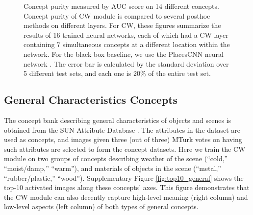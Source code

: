 \documentclass{article}
\begin{document}
\begin{figure}[htbp]
{\begin{minipage}[t]{0.24\linewidth}
\end{minipage}%
}
\centering
\caption{Concept purity measured by AUC score on 14 different concepts. Concept purity of CW module is compared to several posthoc methods on different layers. For CW, these figures summarize the results of 16 trained neural networks, each of which had a CW layer containing 7 simultaneous concepts at a different location within the network. For the black box baseline, we use the PlacesCNN neural network \citep{zhou2017places}. The error bar is calculated by the standard deviation over 5 different test sets, and each one is $20\%$ of the entire test set.}
\label{fig:auc_all}
\end{figure}

\subsection{General Characteristics Concepts}
\label{sec:more_general_concepts}
The concept bank describing general characteristics of objects and scenes is obtained from the SUN Attribute Database \cite{patterson2012sun}. The attributes in the dataset are used as concepts, and images given three (out of three) MTurk votes on having such attributes are selected to form the concept datasets. Here we train the CW module on two groups of concepts describing weather of the scene (``cold,'' ``moist/damp,'' ``warm''), and materials of objects in the scene (``metal,'' ``rubber/plastic,'' ``wood''). Supplementary Figure  \ref{fig:top10_general} shows the top-10 activated images along these concepts' axes. This figure demonstrates that the CW module can also decently capture high-level meaning (right column) and low-level aspects (left column) of both types of general concepts.
\end{document}
